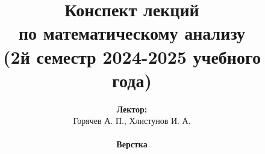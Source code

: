 \documentclass[../main.tex]{subfiles}
\begin{document}
\title{
    \bfseries
    {\Huge Конспект лекций\\ по математическому анализу}\\
    {\large (2й семестр 2024-2025 учебного года)}
}
\author{
    \textbf{Лектор:}\\ Горячев А. П., Хлистунов И. А. 
    \\ ~ \\ 
    \textbf{Верстка}\\%
}

\date{}
\maketitle
\setcounter{page}{2}
\end{document}
